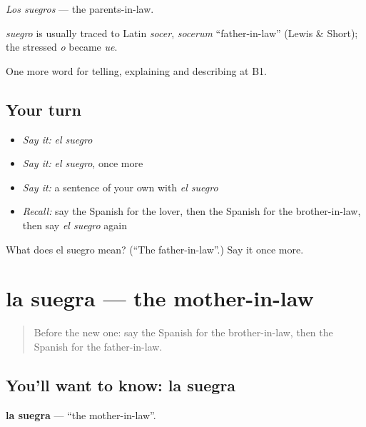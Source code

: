 \emph{Los suegros} — the parents-in-law.

\begin{cousinweb}
\emph{suegro} is usually traced to Latin \emph{socer}, \emph{socerum} \textquotedblleft{}father-in-law\textquotedblright{} (Lewis \& Short); the stressed \emph{o} became \emph{ue}.
\end{cousinweb}

\begin{grammarlens}[title={What you've built}]
One more word for telling, explaining and describing at B1.
\end{grammarlens}

\subsection*{Your turn}
\begin{itemize}
\raggedright
  \item \emph{Say it:} \emph{el suegro}
  \item \emph{Say it:} \emph{el suegro}, once more
  \item \emph{Say it:} a sentence of your own with \emph{el suegro}
  \item \emph{Recall:} say the Spanish for the lover, then the Spanish for the brother-in-law, then say \emph{el suegro} again
\end{itemize}

\begin{tcolorbox}[breakable,colback=teal!4,colframe=teal!35!black,title={Before you move on}]
What does el suegro mean? (\textquotedblleft{}The father-in-law\textquotedblright{}.) Say it once more.
\end{tcolorbox}
\section[la suegra]{la suegra — the mother-in-law}

\label{lesson:ES-C747-suegra}



\begin{quote}
Before the new one: say the Spanish for the brother-in-law, then the Spanish for the father-in-law.
\end{quote}

\subsection*{You'll want to know: la suegra}
\textbf{la suegra} — \textquotedblleft{}the mother-in-law\textquotedblright{}.

